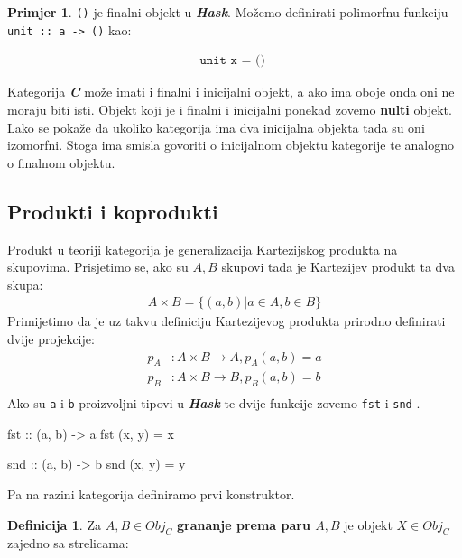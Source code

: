 \documentclass[11pt]{article}
\newcommand{\category}[1]{\textbf{\emph{#1}}}
\newcommand{\codei}[1]{
  {\lstinline[basicstyle=\ttfamily]{#1}}
}
\newcommand{\code}[1]{
  \begin{align*}
    \texttt{#1}
  \end{align*}
  }
\theoremstyle{definition}
\newtheorem{definition}{Definicija}
\newtheorem{primjer}{Primjer}
\begin{document}
  \begin{primjer} \codei{()} je finalni objekt u \category{Hask}.
    Možemo definirati polimorfnu funkciju \codei{unit :: a -> ()} kao:
    \code{
      unit x = ()
    }
  \end{primjer}
  Kategorija \category{C} može imati i finalni i inicijalni objekt, a ako ima
  oboje onda oni ne moraju biti isti. Objekt koji je i finalni i inicijalni ponekad
  zovemo \textbf{nulti} objekt. Lako se pokaže da ukoliko kategorija ima dva inicijalna
  objekta tada su oni izomorfni. Stoga ima smisla govoriti o inicijalnom objektu
  kategorije te analogno o finalnom objektu.
  \subsection{Produkti i koprodukti}
  Produkt u teoriji kategorija je generalizacija Kartezijskog produkta na
  skupovima. Prisjetimo se, ako su $A, B$ skupovi tada je Kartezijev produkt ta
  dva skupa:
  \begin{align*}
    A \times B = \{ (a, b) | a \in A, b \in B\}
  \end{align*}
  Primijetimo da je uz takvu definiciju Kartezijevog produkta prirodno
  definirati dvije projekcije:
  \begin{align*}
    p_A &: A \times B \to A, p_A(a, b) = a\\
    p_B &: A \times B \to B, p_B(a, b) = b\\
  \end{align*}
  Ako su \codei{a} i \codei{b} proizvoljni tipovi u \category{Hask} te dvije
  funkcije zovemo \codei{fst} i \codei{snd}.
  \begin{mcode}
    fst :: (a, b) -> a
    fst (x, y) = x

    snd :: (a, b) -> b
    snd (x, y) = y
  \end{mcode}
  Pa na razini kategorija definiramo prvi konstruktor.
  \begin{definition}
    Za $A, B \in Obj_C$ \textbf{grananje prema paru $A, B$} je objekt $X \in
    Obj_C$
    zajedno sa strelicama:
  \begin{center}
  \end{center}
  \end{definition}
\end{document}
